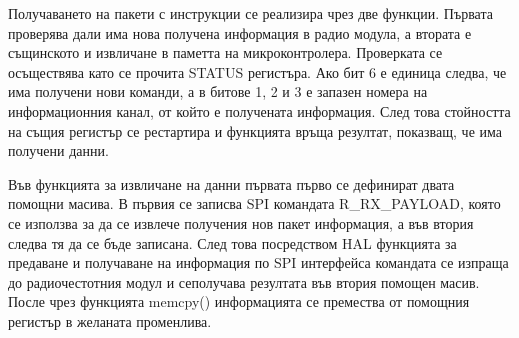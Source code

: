 Получаването на пакети с инструкции се реализира чрез две функции. Първата проверява дали има нова получена информация в радио модула, а втората е същинското и извличане в паметта на микроконтролера. Проверката се осъществява като се прочита STATUS регистъра. Ако бит 6 е единица следва, че има получени нови команди, а в битове 1, 2 и 3 е запазен номера на информационния канал, от който е получената информация. След това стойността на същия регистър се рестартира и функцията връща резултат, показващ, че има получени данни. 



Във функцията за извличане на данни първата първо се дефинират двата помощни масива. В първия се записва SPI командата R\_RX\_PAYLOAD, която се използва за да се извлече получения нов пакет информация, а във втория следва тя да се бъде записана. След това посредством HAL функцията за предаване и получаване на информация по SPI интерфейса командата се изпраща до радиочестотния модул и сеполучава резултата във втория помощен масив. После чрез функцията memcpy() информацията се премества от помощния регистър в желаната променлива.



